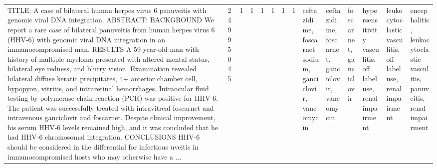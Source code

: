 \begin{longtable}{llllllllllllll}
TITLE: A case of bilateral human herpes virus 6 panuveitis with genomic viral DNA integration. ABSTRACT: BACKGROUND We report a rare case of bilateral panuveitis from human herpes virus 6 (HHV-6) with genomic viral DNA integration in an immunocompromised man.  RESULTS A 59-year-old man with history of multiple myeloma presented with altered mental status, bilateral eye redness, and blurry vision. Examination revealed bilateral diffuse keratic precipitates, 4+ anterior chamber cell, hypopyon, vitritis, and intraretinal hemorrhages. Intraocular fluid testing by polymerase chain reaction (PCR) was positive for HHV-6. The patient was successfully treated with intravitreal foscarnet and intravenous ganciclovir and foscarnet. Despite clinical improvement, his serum HHV-6 levels remained high, and it was concluded that he had HHV-6 chromosomal integration.  CONCLUSIONS HHV-6 should be considered in the differential for infectious uveitis in immunocompromised hosts who may otherwise have a ... & 24995045 &              1 &                     1 &             1 &                 1 &                        1 &                1 &                                                                                                                                                                                                          ceftazidime, foscarnet sodium, ganciclovir, vancomycin &                                                                   ceftazidime, foscarnet, ganciclovir, vancomycin &                                                                                                                                                                                                 foscarnet, ganciclovir &                                                                                                     hypersensitivity vasculitis, off label use, renal impairment &                                                                                                                                                                                                      leukocytoclastic vasculitis, off label use, renal impairment &                                       encephalitis, leukocytoclastic vasculitis, panuveitis, renal impairment \\

\end{longtable}
